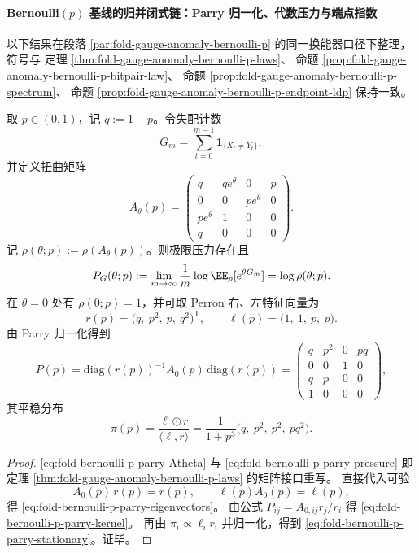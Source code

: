 \paragraph{Bernoulli\texorpdfstring{$(p)$}{(p)} 基线的归并闭式链：Parry 归一化、代数压力与端点指数}
以下结果在段落 \ref{par:fold-gauge-anomaly-bernoulli-p} 的同一换能器口径下整理，符号与
定理 \ref{thm:fold-gauge-anomaly-bernoulli-p-laws}、
命题 \ref{prop:fold-gauge-anomaly-bernoulli-p-bitpair-law}、
命题 \ref{prop:fold-gauge-anomaly-bernoulli-p-spectrum}、
命题 \ref{prop:fold-gauge-anomaly-bernoulli-p-endpoint-ldp}
保持一致。

\begin{theorem}\label{thm:fold-bernoulli-p-parry-pressure-chain}
取 \(p\in(0,1)\)，记 \(q:=1-p\)。令失配计数
\[
G_m=\sum_{t=0}^{m-1}\mathbf 1_{\{X_t\neq Y_t\}},
\]
并定义扭曲矩阵
\begin{equation}\label{eq:fold-bernoulli-p-parry-Atheta}
A_{\theta}(p)=
\begin{pmatrix}
q&q e^\theta&0&p\\
0&0&p e^\theta&0\\
p e^\theta&1&0&0\\
q&0&0&0
\end{pmatrix}.
\end{equation}
记 \(\rho(\theta;p):=\rho(A_\theta(p))\)。则极限压力存在且
\begin{equation}\label{eq:fold-bernoulli-p-parry-pressure}
P_G(\theta;p):=\lim_{m\to\infty}\frac1m\log\EE_p[e^{\theta G_m}]
=\log \rho(\theta;p).
\end{equation}
在 \(\theta=0\) 处有 \(\rho(0;p)=1\)，并可取 Perron 右、左特征向量为
\begin{equation}\label{eq:fold-bernoulli-p-parry-eigenvectors}
r(p)=\bigl(q,\ p^2,\ p,\ q^2\bigr)^{\mathsf T},
\qquad
\ell(p)=\bigl(1,\ 1,\ p,\ p\bigr).
\end{equation}
由 Parry 归一化得到
\begin{equation}\label{eq:fold-bernoulli-p-parry-kernel}
P(p)=\mathrm{diag}(r(p))^{-1}A_0(p)\,\mathrm{diag}(r(p))
=
\begin{pmatrix}
q&p^2&0&pq\\
0&0&1&0\\
q&p&0&0\\
1&0&0&0
\end{pmatrix},
\end{equation}
其平稳分布
\begin{equation}\label{eq:fold-bernoulli-p-parry-stationary}
\pi(p)=\frac{\ell\odot r}{\langle \ell,r\rangle}
=\frac1{1+p^3}\bigl(q,\ p^2,\ p^2,\ p q^2\bigr).
\end{equation}
\end{theorem}
\begin{proof}
\eqref{eq:fold-bernoulli-p-parry-Atheta} 与
\eqref{eq:fold-bernoulli-p-parry-pressure} 即
定理 \ref{thm:fold-gauge-anomaly-bernoulli-p-laws} 的矩阵接口重写。
直接代入可验
\[
A_0(p)\,r(p)=r(p),\qquad
\ell(p)A_0(p)=\ell(p),
\]
得 \eqref{eq:fold-bernoulli-p-parry-eigenvectors}。
由公式
\(
P_{ij}=A_{0,ij}r_j/r_i
\)
得 \eqref{eq:fold-bernoulli-p-parry-kernel}。
再由
\(
\pi_i\propto \ell_i r_i
\)
并归一化，得到 \eqref{eq:fold-bernoulli-p-parry-stationary}。证毕。
\end{proof}

